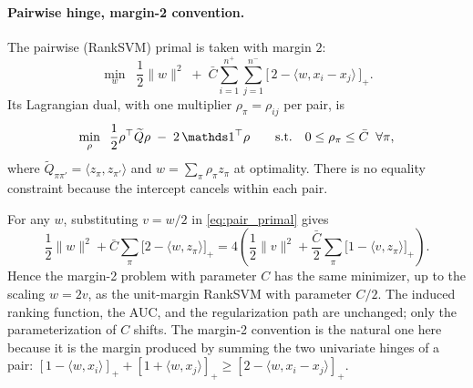 \paragraph{Pairwise hinge, margin-2 convention.}
The pairwise (RankSVM) primal is taken with margin $2$:
\begin{equation}
\min_{w}\;\; \frac{1}{2}\|w\|^2
\;+\; \bar{C} \sum_{i=1}^{n^+} \sum_{j=1}^{n^-}
\bigl[\, 2 - \langle w, x_i - x_j \rangle \,\bigr]_+ .
\label{eq:pair_primal}
\end{equation}
Its Lagrangian dual, with one multiplier $\rho_\pi = \rho_{ij}$ per pair, is
\begin{equation}
\min_{\rho}\;\; \frac{1}{2} \rho^\top \widetilde{Q} \rho
\;-\; 2\,\mathbbm{1}^\top \rho
\qquad \text{s.t.} \quad 0 \le \rho_\pi \le \bar{C} \;\;\forall \pi,
\label{eq:pair_dual}
\end{equation}
where $\widetilde{Q}_{\pi\pi'} = \langle z_\pi, z_{\pi'} \rangle$ and
$w = \sum_\pi \rho_\pi z_\pi$ at optimality. There is no equality constraint
because the intercept cancels within each pair.

\begin{remark}
\label{rem:margin2}
For any $w$, substituting $v = w/2$ in \eqref{eq:pair_primal} gives
\[
\frac{1}{2}\|w\|^2 + \bar{C}\sum_{\pi}\bigl[2 - \langle w, z_\pi\rangle\bigr]_+
= 4\left( \frac{1}{2}\|v\|^2
+ \frac{\bar{C}}{2}\sum_{\pi}\bigl[1 - \langle v, z_\pi\rangle\bigr]_+ \right).
\]
Hence the margin-2 problem with parameter $C$ has the same minimizer, up to
the scaling $w = 2v$, as the unit-margin RankSVM with parameter $C/2$. The
induced ranking function, the AUC, and the regularization path are unchanged;
only the parameterization of $C$ shifts. The margin-2 convention is the
natural one here because it is the margin produced by summing the two
univariate hinges of a pair:
$[1 - \langle w, x_i\rangle]_+ + [1 + \langle w, x_j\rangle]_+
\ge [2 - \langle w, x_i - x_j\rangle]_+$.
\end{remark}

